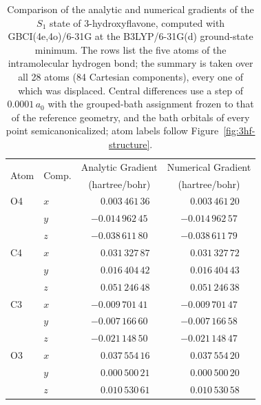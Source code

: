 \begin{table}[htbp]
  \centering
  \caption{
  Comparison of the analytic and numerical gradients of the $S_1$ state of
  3-hydroxyflavone, computed with GBCI(4e,4o)/6-31G at the
  B3LYP/6-31G(d) ground-state minimum. The rows list the five atoms of
  the intramolecular hydrogen bond; the summary is taken over all 28
  atoms (84 Cartesian components), every one of which was displaced.
  Central differences use a step of $0.0001\,a_0$ with the grouped-bath
  assignment frozen to that of the reference geometry, and the bath
  orbitals of every point semicanonicalized; atom labels follow
  Figure~\ref{fig:3hf-structure}.
  }
  \label{tab:3hf-s1-gradient}
  \begin{tabular}{llcc}
    \hline
    \multirow{2}{*}{Atom} & \multirow{2}{*}{Comp.} &
    \multicolumn{1}{c}{Analytic Gradient} &
    \multicolumn{1}{c}{Numerical Gradient} \\
    & & \multicolumn{1}{c}{(hartree/bohr)} & \multicolumn{1}{c}{(hartree/bohr)} \\
    \hline
    O4 & $x$ & $\phantom{-}0.003\,461\,36$ & $\phantom{-}0.003\,461\,20$ \\
       & $y$ & $-0.014\,962\,45$ & $-0.014\,962\,57$ \\
       & $z$ & $-0.038\,611\,80$ & $-0.038\,611\,79$ \\[2pt]
    C4 & $x$ & $\phantom{-}0.031\,327\,87$ & $\phantom{-}0.031\,327\,72$ \\
       & $y$ & $\phantom{-}0.016\,404\,42$ & $\phantom{-}0.016\,404\,43$ \\
       & $z$ & $\phantom{-}0.051\,246\,48$ & $\phantom{-}0.051\,246\,38$ \\[2pt]
    C3 & $x$ & $-0.009\,701\,41$ & $-0.009\,701\,47$ \\
       & $y$ & $-0.007\,166\,60$ & $-0.007\,166\,58$ \\
       & $z$ & $-0.021\,148\,50$ & $-0.021\,148\,47$ \\[2pt]
    O3 & $x$ & $\phantom{-}0.037\,554\,16$ & $\phantom{-}0.037\,554\,20$ \\
       & $y$ & $\phantom{-}0.000\,500\,21$ & $\phantom{-}0.000\,500\,20$ \\
       & $z$ & $\phantom{-}0.010\,530\,61$ & $\phantom{-}0.010\,530\,58$ \\[2pt]

\end{tabular}
\end{table}
